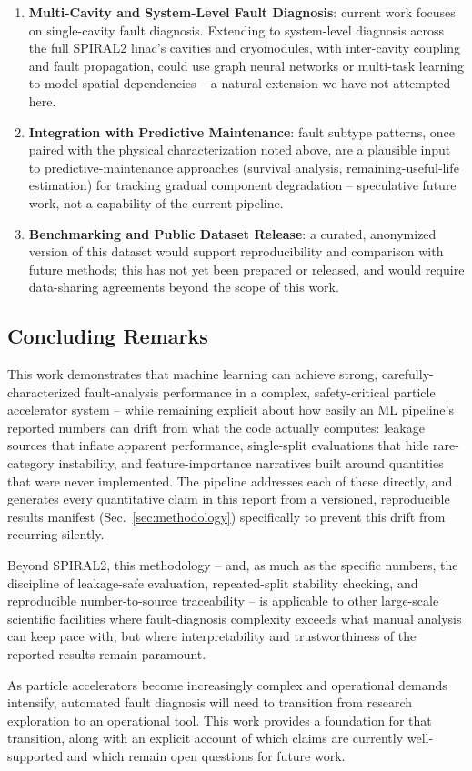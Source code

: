 \begin{enumerate}
    \item \textbf{Multi-Cavity and System-Level Fault Diagnosis}: current work focuses on single-cavity fault diagnosis. Extending to system-level diagnosis across the full SPIRAL2 linac's cavities and cryomodules, with inter-cavity coupling and fault propagation, could use graph neural networks or multi-task learning to model spatial dependencies -- a natural extension we have not attempted here.

    \item \textbf{Integration with Predictive Maintenance}: fault subtype patterns, once paired with the physical characterization noted above, are a plausible input to predictive-maintenance approaches (survival analysis, remaining-useful-life estimation) for tracking gradual component degradation -- speculative future work, not a capability of the current pipeline.

    \item \textbf{Benchmarking and Public Dataset Release}: a curated, anonymized version of this dataset would support reproducibility and comparison with future methods; this has not yet been prepared or released, and would require data-sharing agreements beyond the scope of this work.
\end{enumerate}

\subsection{Concluding Remarks}

This work demonstrates that machine learning can achieve strong, carefully-characterized fault-analysis performance in a complex, safety-critical particle accelerator system -- while remaining explicit about how easily an ML pipeline's reported numbers can drift from what the code actually computes: leakage sources that inflate apparent performance, single-split evaluations that hide rare-category instability, and feature-importance narratives built around quantities that were never implemented. The pipeline addresses each of these directly, and generates every quantitative claim in this report from a versioned, reproducible results manifest (Sec.~\ref{sec:methodology}) specifically to prevent this drift from recurring silently.

Beyond SPIRAL2, this methodology -- and, as much as the specific numbers, the discipline of leakage-safe evaluation, repeated-split stability checking, and reproducible number-to-source traceability -- is applicable to other large-scale scientific facilities where fault-diagnosis complexity exceeds what manual analysis can keep pace with, but where interpretability and trustworthiness of the reported results remain paramount.

As particle accelerators become increasingly complex and operational demands intensify, automated fault diagnosis will need to transition from research exploration to an operational tool. This work provides a foundation for that transition, along with an explicit account of which claims are currently well-supported and which remain open questions for future work.

